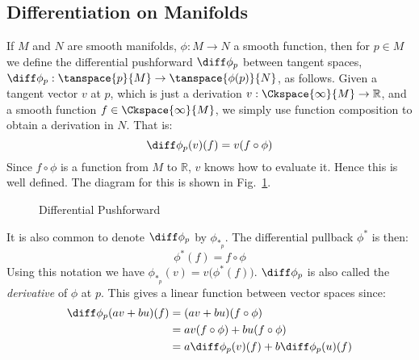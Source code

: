 \documentclass{book}                                                            %
\begin{document}
            \subsection{Differentiation on Manifolds}
                If $M$ and $N$ are smooth manifolds, $\phi:M\rightarrow{N}$ a
                smooth function, then for $p\in{M}$ we define the differential
                pushforward $\diff\phi_{p}$ between tangent spaces,
                $\diff\phi_{p}:\tanspace{p}{M}\rightarrow\tanspace{\phi(p)}{N}$,
                as follows. Given a tangent vector $v$ at $p$, which is just a
                derivation $v:\Ckspace{\infty}{M}\rightarrow\mathbb{R}$, and a
                smooth function $f\in\Ckspace{\infty}{M}$, we simply use
                function composition to obtain a derivation in $N$. That is:
                \begin{equation}
                    \diff\phi_{p}(v)(f)=v(f\circ\phi)
                \end{equation}
                Since $f\circ\phi$ is a function from $M$ to $\mathbb{R}$, $v$
                knows how to evaluate it. Hence this is well defined. The
                diagram for this is shown in
                Fig.~\ref{fig:Differential_Pushforward}.
                \begin{figure}[H]
                    \centering
                    \captionsetup{type=figure}
                    
                    \caption{Differential Pushforward}
                    \label{fig:Differential_Pushforward}
                \end{figure}
                It is also common to denote $\diff\phi_{p}$ by
                $\phi_{*_{p}}$. The differential pullback $\phi^{*}$ is then:
                \begin{equation}
                    \phi^{*}(f)=f\circ\phi
                \end{equation}
                Using this notation we have
                $\phi_{*_{p}}(v)=v\big(\phi^{*}(f)\big)$. $\diff\phi_{p}$ is
                also called the \textit{derivative} of $\phi$ at $p$. This gives
                a linear function between vector spaces since:
                \begin{subequations}
                    \begin{align}
                        \diff\phi_{p}(av+bu)(f)&=(av+bu)(f\circ\phi)\\
                        &=av(f\circ\phi)+bu(f\circ\phi)\\
                        &=a\diff\phi_{p}(v)(f)+b\diff\phi_{p}(u)(f)
                    \end{align}
                \end{subequations}
\end{document}
